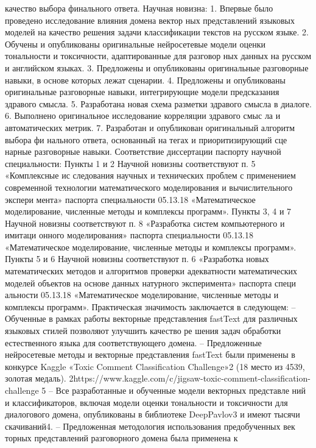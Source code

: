 качество выбора финального ответа.
Научная новизна:
1. Впервые было проведено исследование влияния домена вектор
ных представлений языковых моделей на качество решения задачи
классификации текстов на русском языке.
2. Обучены и опубликованы оригинальные нейросетевые модели
оценки тональности и токсичности, адаптированные для разговор
ных данных на русском и английском языках.
3. Предложены и опубликованы оригинальные разговорные навыки,
в основе которых лежат сценарии.
4. Предложены и опубликованы оригинальные разговорные навыки,
интегрирующие модели предсказания здравого смысла.
5. Разработана новая схема разметки здравого смысла в диалоге.
6. Выполнено оригинальное исследование корреляции здравого смыс
ла и автоматических метрик.
7. Разработан и опубликован оригинальный алгоритм выбора фи
нального ответа, основанный на тегах и приоритизирующий сце
нарные разговорные навыки.
Соответствие диссертации паспорту научной специальности:
Пункты 1 и 2 Научной новизны соответствуют п. 5 «Комплексные ис
следования научных и технических проблем с применением современной
технологии математического моделирования и вычислительного экспери
мента» паспорта специальности 05.13.18 «Математическое моделирование,
численные методы и комплексы программ». Пункты 3, 4 и 7 Научной
новизны соответствуют п. 8 «Разработка систем компьютерного и имитаци
онного моделирования» паспорта специальности 05.13.18 «Математическое
моделирование, численные методы и комплексы программ». Пункты 5 и 6
Научной новизны соответствуют п. 6 «Разработка новых математических
методов и алгоритмов проверки адекватности математических моделей
объектов на основе данных натурного эксперимента» паспорта специ
альности 05.13.18 «Математическое моделирование, численные методы и
комплексы программ».
Практическая значимость заключается в следующем:
– Обученные в рамках работы векторные представления fastText
для различных языковых стилей позволяют улучшить качество ре
шения задач обработки естественного языка для соответствующего
домена.
– Предложенные нейросетевые методы и векторные представления
fastText были применены в конкурсе Kaggle «Toxic Comment
Classification Challenge»2 (18 место из 4539, золотая медаль).
2https://www.kaggle.com/c/jigsaw-toxic-comment-classification-challenge
5
– Все разработанные и обученные модели векторных представле
ний и классификаторов, включая модели оценки тональности и
токсичности для диалогового домена, опубликованы в библиотеке
DeepPavlov3 и имеют тысячи скачиваний4.
– Предложенная методология использования предобученных век
торных представлений разговорного домена была применена к
